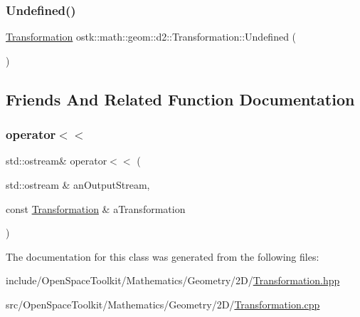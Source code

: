 \mbox{\label{classostk_1_1math_1_1geom_1_1d2_1_1_transformation_a55457472768446de4806b6033ec15b73}} 
\subsubsection{\texorpdfstring{Undefined()}{Undefined()}}
{\footnotesize\ttfamily \hyperlink{classostk_1_1math_1_1geom_1_1d2_1_1_transformation}{Transformation} ostk\+::math\+::geom\+::d2\+::\+Transformation\+::\+Undefined (\begin{DoxyParamCaption}{ }\end{DoxyParamCaption})\hspace{0.3cm}{\ttfamily [static]}}



\subsection{Friends And Related Function Documentation}
\mbox{\label{classostk_1_1math_1_1geom_1_1d2_1_1_transformation_afb2829e106dc4aeab1c706d1eaa357e8}} 
\subsubsection{\texorpdfstring{operator$<$$<$}{operator<<}}
{\footnotesize\ttfamily std\+::ostream\& operator$<$$<$ (\begin{DoxyParamCaption}\item[{std\+::ostream \&}]{an\+Output\+Stream,  }\item[{const \hyperlink{classostk_1_1math_1_1geom_1_1d2_1_1_transformation}{Transformation} \&}]{a\+Transformation }\end{DoxyParamCaption})\hspace{0.3cm}{\ttfamily [friend]}}



The documentation for this class was generated from the following files\+:\begin{DoxyCompactItemize}
\item 
include/\+Open\+Space\+Toolkit/\+Mathematics/\+Geometry/2\+D/\hyperlink{2_d_2_transformation_8hpp}{Transformation.\+hpp}\item 
src/\+Open\+Space\+Toolkit/\+Mathematics/\+Geometry/2\+D/\hyperlink{2_d_2_transformation_8cpp}{Transformation.\+cpp}\end{DoxyCompactItemize}
